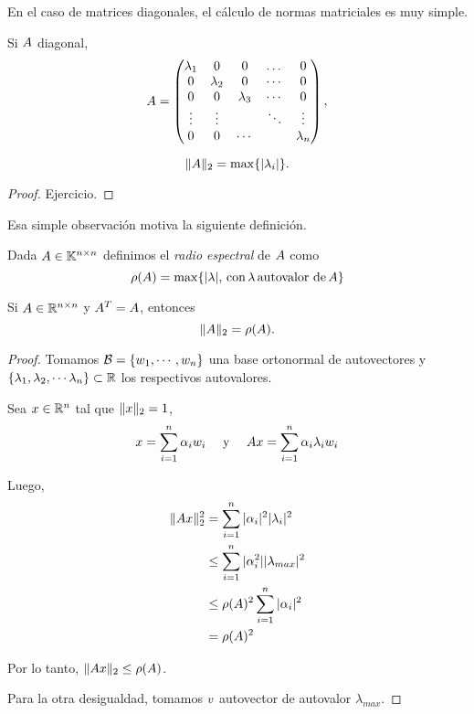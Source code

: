 En el caso de matrices diagonales, el cálculo de normas matriciales es muy simple.

\begin{prop} Si $\Ab$ diagonal,
  $$\Ab=
 \begin{pmatrix}
  \lambda_1&0&0&\dots&0\\
  0&\lambda_2&0&\cdots &0 \\
  0&0&\lambda_3 &\cdots&0 \\
  \vdots&\vdots & &\ddots&\vdots\\
  0&0&\cdots &&\lambda_n
 \end{pmatrix},
 $$

 $$
 \|\Ab\|_2 = \max\{|\lambda_i|\}.
 $$
\end{prop}
\begin{proof}
Ejercicio.
\end{proof}

Esa simple observación motiva la siguiente definición.

\begin{defi}
 Dada $\Ab\in \Knn$ definimos el \emph{radio espectral} de $\Ab$ como
 $$
 \rho(\Ab)=\max\{|\lambda|, \, \mbox{con}\, \lambda \,\mbox{autovalor de}\, \Ab\}
 $$
\end{defi}

\begin{prop} Si  $\Ab\in \Rnn$ y $\Ab^T=\Ab$, entonces
$$
\|\Ab\|_2=\rho(\Ab).
$$
\end{prop}

\begin{proof}
Tomamos $\mathcal{B}=\{\wb_1,\cdots,\wb_n\}$ una base ortonormal de autovectores y $\{\lambda_1, \lambda_2,\cdots \lambda_n\}\subset \mathbb R$ los respectivos autovalores.

Sea $\xb\in\R^n$ tal que $\|\xb\|_2=1$,
$$
\xb=\sum_{i=1}^n\alpha_i\wb_i \quad \text{ y } \quad \Ab\xb=\sum_{i=1}^n\alpha_i \lambda_i \wb_i
$$

Luego,
$$
\begin{aligned}
\|\Ab\xb\|_2^2 &= \sum_{i=1}^n |\alpha_i|^2 |\lambda_i|^2 \\
& \le \sum_{i=1}^n |\alpha_i^2| |\lambda_{max}|^2 \\
& \le \rho(\Ab)^2\sum_{i=1}^n |\alpha_i|^2 \\
& = \rho(\Ab)^2
\end{aligned}
$$

Por lo tanto, $\|\Ab\xb\|_2  \le \rho(\Ab)$.

Para la otra desigualdad, tomamos $\vb$ autovector de autovalor $\lambda_{max}$.

\end{proof}

